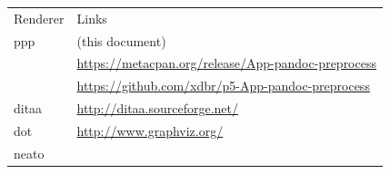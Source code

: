 \documentclass[]{article}
\begin{document}
\begin{longtable}[c]{@{}ll@{}}
\toprule\addlinespace
\begin{minipage}[b]{0.15\columnwidth}\raggedright
Renderer
\end{minipage} & \begin{minipage}[b]{0.79\columnwidth}\raggedright
Links
\end{minipage}
\\\addlinespace
\midrule\endhead
\begin{minipage}[t]{0.15\columnwidth}\raggedright
ppp
\end{minipage} & \begin{minipage}[t]{0.79\columnwidth}\raggedright
(this document)
\end{minipage}
\\\addlinespace
\begin{minipage}[t]{0.15\columnwidth}\raggedright
\end{minipage} & \begin{minipage}[t]{0.79\columnwidth}\raggedright
\url{https://metacpan.org/release/App-pandoc-preprocess}
\end{minipage}
\\\addlinespace
\begin{minipage}[t]{0.15\columnwidth}\raggedright
\end{minipage} & \begin{minipage}[t]{0.79\columnwidth}\raggedright
\url{https://github.com/xdbr/p5-App-pandoc-preprocess}
\end{minipage}
\\\addlinespace
\begin{minipage}[t]{0.15\columnwidth}\raggedright
ditaa
\end{minipage} & \begin{minipage}[t]{0.79\columnwidth}\raggedright
\url{http://ditaa.sourceforge.net/}
\end{minipage}
\\\addlinespace
\begin{minipage}[t]{0.15\columnwidth}\raggedright
dot
\end{minipage} & \begin{minipage}[t]{0.79\columnwidth}\raggedright
\url{http://www.graphviz.org/}
\end{minipage}
\\\addlinespace
\begin{minipage}[t]{0.15\columnwidth}\raggedright
neato
\end{minipage} & \begin{minipage}[t]{0.79\columnwidth}\raggedright

\end{minipage}
\end{longtable}
\end{document}
